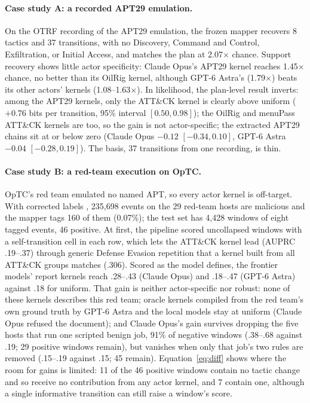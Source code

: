 \documentclass[letterpaper]{article}
\begin{document}
\paragraph{Case study A: a recorded APT29 emulation.} On the OTRF recording of the APT29 emulation, the frozen mapper recovers 8 tactics and 37 transitions, with no Discovery, Command and Control, Exfiltration, or Initial Access, and matches the plan at 2.07$\times$ chance. Support recovery shows little actor specificity: Claude Opus's APT29 kernel reaches 1.45$\times$ chance, no better than its OilRig kernel, although GPT-6 Astra's (1.79$\times$) beats its other actors' kernels (1.08--1.63$\times$). In likelihood, the plan-level result inverts: among the APT29 kernels, only the ATT\&CK kernel is clearly above uniform ($+0.76$ bits per transition, 95\% interval $[0.50, 0.98]$); the OilRig and menuPass ATT\&CK kernels are too, so the gain is not actor-specific; the extracted APT29 chains sit at or below zero (Claude Opus $-0.12$ $[-0.34, 0.10]$, GPT-6 Astra $-0.04$ $[-0.28, 0.19]$). The basis, 37 transitions from one recording, is thin.

\paragraph{Case study B: a red-team execution on OpTC.} OpTC's red team emulated no named APT, so every actor kernel is off-target. With corrected labels \citep{majorczyk2025optc}, 235,698 events on the 29 red-team hosts are malicious and the mapper tags 160 of them (0.07\%); the test set has 4,428 windows of eight tagged events, 46 positive. At first, the pipeline scored uncollapsed windows with a self-transition cell in each row, which lets the ATT\&CK kernel lead (AUPRC .19--.37) through generic Defense Evasion repetition that a kernel built from all ATT\&CK groups matches (.306). Scored as the model defines, the frontier models' report kernels reach .28--.43 (Claude Opus) and .18--.47 (GPT-6 Astra) against .18 for uniform. That gain is neither actor-specific nor robust: none of these kernels describes this red team; oracle kernels compiled from the red team's own ground truth by GPT-6 Astra and the local models stay at uniform (Claude Opus refused the document); and Claude Opus's gain survives dropping the five hosts that run one scripted benign job, 91\% of negative windows (.38--.68 against .19; 29 positive windows remain), but vanishes when only that job's two rules are removed (.15--.19 against .15; 45 remain). Equation~\eqref{eq:diff} shows where the room for gains is limited: 11 of the 46 positive windows contain no tactic change and so receive no contribution from any actor kernel, and 7 contain one, although a single informative transition can still raise a window's score.
\end{document}
